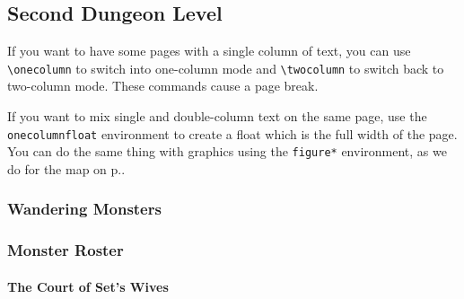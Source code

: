 \documentclass[letterpaper,serif]{module}
\begin{document}
\begin{onecolumnfloat}[t]
\part{Second Dungeon Level}

If you want to have some pages with a single column of text, you can use \verb|\onecolumn| to switch
into one-column mode and \verb|\twocolumn| to switch back to two-column mode. These commands cause
a page break.

If you want to mix single and double-column text on the same page, use the \verb|onecolumnfloat| environment
to create a float which is the full width of the page. You can do the same thing with graphics using
the \verb|figure*| environment, as we do for the map on p.\pageref{img:map}.

\section*{Wandering Monsters}
\label{wanderingmonsters}



\begin{wanderingmonsters}[b]
\end{wanderingmonsters}

\section*{Monster Roster}

\begin{monsterroster}
\end{monsterroster}
\end{onecolumnfloat}

\lipsum[7]

\subsection{The Court of Set's Wives} %
\end{document}
